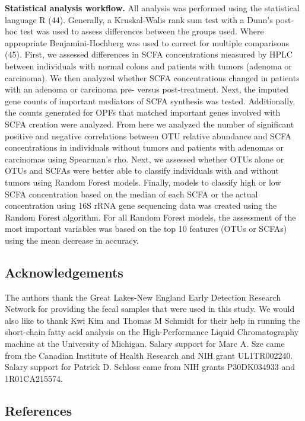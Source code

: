 \documentclass[11pt,]{article}
\begin{document}
\textbf{Statistical analysis workflow.} All analysis was performed using
the statistical language R (44). Generally, a Kruskal-Walis rank sum
test with a Dunn's post-hoc test was used to assess differences between
the groups used. Where appropriate Benjamini-Hochberg was used to
correct for multiple comparisons (45). First, we assessed differences in
SCFA concentrations measured by HPLC between individuals with normal
colons and patients with tumors (adenoma or carcinoma). We then analyzed
whether SCFA concentrations changed in patients with an adenoma or
carcinoma pre- versus post-treatment. Next, the imputed gene counts of
important mediators of SCFA synthesis was tested. Additionally, the
counts generated for OPFs that matched important genes involved with
SCFA creation were analyzed. From here we analyzed the number of
significant positive and negative correlations between OTU relative
abundance and SCFA concentrations in individuals without tumors and
patients with adenomas or carcinomas using Spearman's rho. Next, we
assessed whether OTUs alone or OTUs and SCFAs were better able to
classify individuals with and without tumors using Random Forest models.
Finally, models to classify high or low SCFA concentration based on the
median of each SCFA or the actual concentration using 16S rRNA gene
sequencing data was created using the Random Forest algorithm. For all
Random Forest models, the assessment of the most important variables was
based on the top 10 features (OTUs or SCFAs) using the mean decrease in
accuracy.

\newpage

\subsection{Acknowledgements}\label{acknowledgements}

The authors thank the Great Lakes-New England Early Detection Research
Network for providing the fecal samples that were used in this study. We
would also like to thank Kwi Kim and Thomas M Schmidt for their help in
running the short-chain fatty acid analysis on the High-Performance
Liquid Chromatography machine at the University of Michigan. Salary
support for Marc A. Sze came from the Canadian Institute of Health
Research and NIH grant UL1TR002240. Salary support for Patrick D.
Schloss came from NIH grants P30DK034933 and 1R01CA215574.

\newpage

\subsection{References}\label{references}
\end{document}
